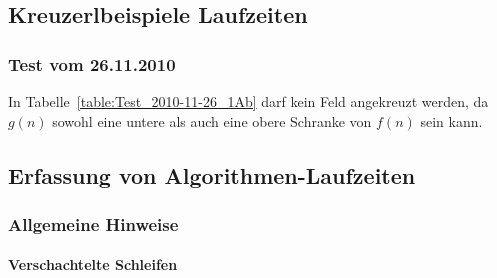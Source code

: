 \documentclass[a4paper, 12pt]{article}
\begin{document}
\subsection{Kreuzerlbeispiele Laufzeiten}

\subsubsection{Test vom 26.11.2010}

\begin{table}[htbp]

\caption{Beispiel 1b) der Gruppe A}
\label{table:Test_2010-11-26_1Ab}
	\begin{center}
\end{center}
\end{table}

In Tabelle~\ref{table:Test_2010-11-26_1Ab} darf kein Feld angekreuzt werden, da $g\left(n\right)$ sowohl eine untere als auch eine obere Schranke von  $f\left(n\right)$ sein kann.

\subsection{Erfassung von Algorithmen-Laufzeiten}

\subsubsection{Allgemeine Hinweise}

\paragraph{Verschachtelte Schleifen}~\\
\end{document}
